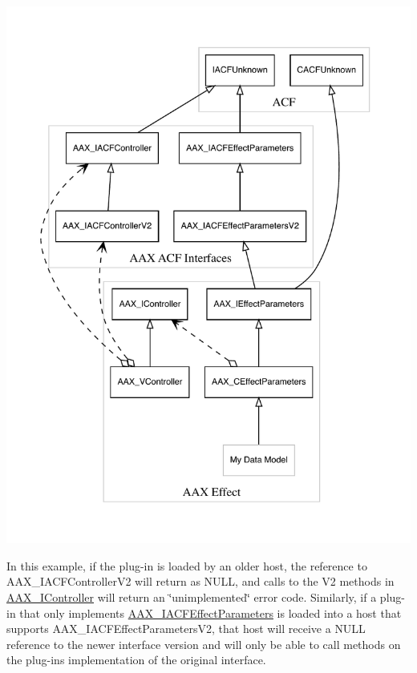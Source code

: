 \begin{DoxyImage}
\includegraphics[width=\textwidth,height=\textheight/2,keepaspectratio=true]{dot_aax_acf_versioning_plug-in_v2}
\end{DoxyImage}
 In this example, if the plug-\/in is loaded by an older host, the reference to {\ttfamily A\+A\+X\+\_\+\+I\+A\+C\+F\+Controller\+V2} will return as {\ttfamily N\+U\+LL}, and calls to the V2 methods in \mbox{\hyperlink{a01789}{A\+A\+X\+\_\+\+I\+Controller}} will return an \char`\"{}unimplemented\char`\"{} error code. Similarly, if a plug-\/in that only implements \mbox{\hyperlink{a01669}{A\+A\+X\+\_\+\+I\+A\+C\+F\+Effect\+Parameters}} is loaded into a host that supports {\ttfamily A\+A\+X\+\_\+\+I\+A\+C\+F\+Effect\+Parameters\+V2}, that host will receive a {\ttfamily N\+U\+LL} reference to the newer interface version and will only be able to call methods on the plug-\/in\textquotesingle{}s implementation of the original interface.

